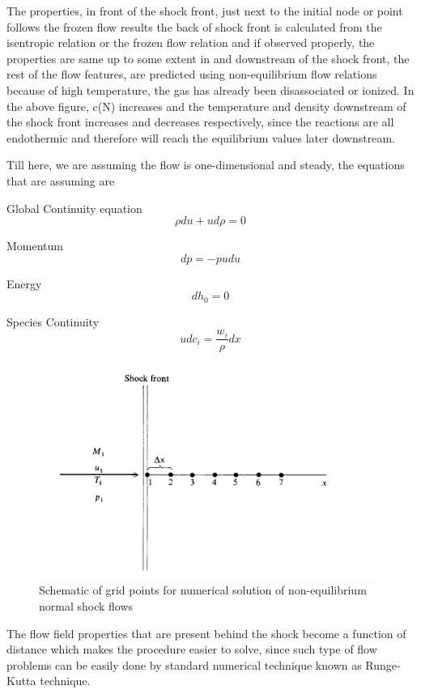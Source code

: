The properties, in front of the shock front, just next to the initial node or point follows the frozen flow results the back of shock front is calculated from the isentropic relation or the frozen flow relation and if observed properly, the properties are same up to some extent in and downstream of the shock front, the rest of the flow features, are predicted using non-equilibrium flow relations because of high temperature, the gas has already been disassociated or ionized. In the above figure, c(N) increases and the temperature and density downstream of the shock front increases and decreases respectively, since the reactions are all endothermic and therefore will reach the equilibrium values later downstream.

Till here, we are assuming the flow is one-dimensional and steady, the equations that are assuming are

Global Continuity equation \vspace{3mm}
\[ \rho du + u d\rho = 0\]

Momentum \vspace{3mm}
\[dp =-p u du\]

Energy \vspace{3mm}
\[dh_0 = 0\]

Species Continuity \vspace{3mm}
\[u dc_i = \frac{w_i}{\rho} dx\]


\begin{figure}[ht]

\centering
  \includegraphics[width=0.7\linewidth]{images/numerical_method.png}
  \caption{Schematic of grid points for numerical solution of non-equilibrium normal shock flows}
  \label{fig:boat1}
\end{figure}

The flow field properties that are present behind the shock become a function of distance which makes the procedure easier to solve, since such type of flow problems can be easily done by standard numerical technique known as Runge-Kutta technique.

